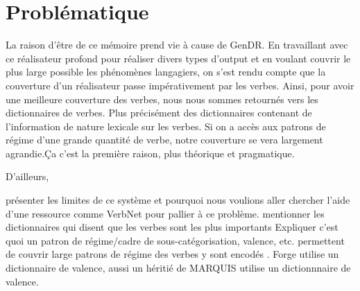 \section{Problématique}\label{problema}
La raison d'être de ce mémoire prend vie à cause de GenDR. En travaillant avec ce réalisateur profond pour réaliser divers types d'output et en voulant couvrir le plus large possible les phénomènes langagiers, on s'est rendu compte que la couverture d'un réalisateur passe impérativement par les verbes. Ainsi, pour avoir une meilleure couverture des verbes, nous nous sommes retournés vers les dictionnaires de verbes. Plus précisément des dictionnaires contenant de l'information de nature lexicale sur les verbes. Si on a accès aux patrons de régime d'une grande quantité de verbe, notre couverture se vera largement agrandie.Ça c'est la première raison, plus théorique et pragmatique. 

D'ailleurs, 

présenter les limites de ce système et pourquoi nous voulions aller chercher l'aide d'une ressource comme VerbNet pour pallier à ce problème.
mentionner les dictionnaires qui disent que les verbes sont les plus importants
Expliquer c'est quoi un patron de régime/cadre de sous-catégorisation, valence, etc.
permettent de couvrir large
patrons de régime des verbes y sont encodés
.
Forge utilise un dictionnaire de valence, aussi un héritié de MARQUIS utilise un dictionnnaire de valence.